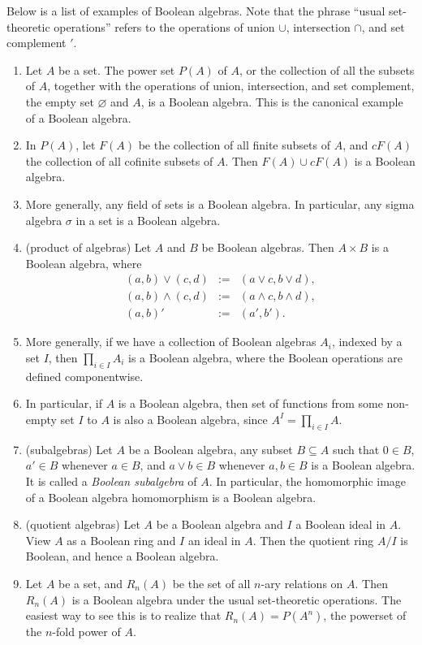 \documentclass[12pt]{article}
\begin{document}
Below is a list of examples of Boolean algebras.  Note that the phrase ``usual set-theoretic operations'' refers to the operations of union $\cup$, intersection $\cap$, and set complement $'$.

\begin{enumerate}
\item Let $A$ be a set.  The power set $P(A)$ of $A$, or the collection of all the subsets of $A$, together with the operations of union, intersection, and set complement, the empty set $\varnothing$ and $A$, is a Boolean algebra.  This is the canonical example of a Boolean algebra.
\item In $P(A)$, let $F(A)$ be the collection of all finite subsets of $A$, and $cF(A)$ the collection of all cofinite subsets of $A$.  Then $F(A)\cup cF(A)$ is a Boolean algebra.
\item More generally, any field of sets is a Boolean algebra.  In particular, any sigma algebra $\sigma$ in a set is a Boolean algebra.
\item (product of algebras) Let $A$ and $B$ be Boolean algebras.  Then $A\times B$ is a Boolean algebra, where 
\begin{eqnarray}
(a,b)\vee (c,d)&:=&(a\vee c, b\vee d),\\ 
(a,b)\wedge (c,d)&:=& (a\wedge c,b\wedge d),\\
(a,b)'&:=&(a',b').
\end{eqnarray}
\item More generally, if we have a collection of Boolean algebras $A_i$, indexed by a set $I$, then $\prod_{i\in I} A_i$ is a Boolean algebra, where the Boolean operations are defined componentwise.  
\item In particular, if $A$ is a Boolean algebra, then set of functions from some non-empty set $I$ to $A$ is also a Boolean algebra, since $A^I=\prod_{i\in I} A$.
\item (subalgebras) Let $A$ be a Boolean algebra, any subset $B\subseteq A$ such that $0\in B$, $a'\in B$ whenever $a\in B$, and $a\vee b\in B$ whenever $a,b\in B$ is a Boolean algebra.  It is called a \emph{Boolean subalgebra} of $A$.  In particular, the homomorphic image of a Boolean algebra homomorphism is a Boolean algebra.
\item (quotient algebras) Let $A$ be a Boolean algebra and $I$ a Boolean ideal in $A$.  View $A$ as a Boolean ring and $I$ an ideal in $A$.  Then the quotient ring $A/I$ is Boolean, and hence a Boolean algebra.
\item Let $A$ be a set, and $R_n(A)$ be the set of all $n$-ary relations on $A$.  Then $R_n(A)$ is a Boolean algebra under the usual set-theoretic operations.  The easiest way to see this is to realize that $R_n(A)=P(A^n)$, the powerset of the $n$-fold power of $A$.

\end{enumerate}
\end{document}
